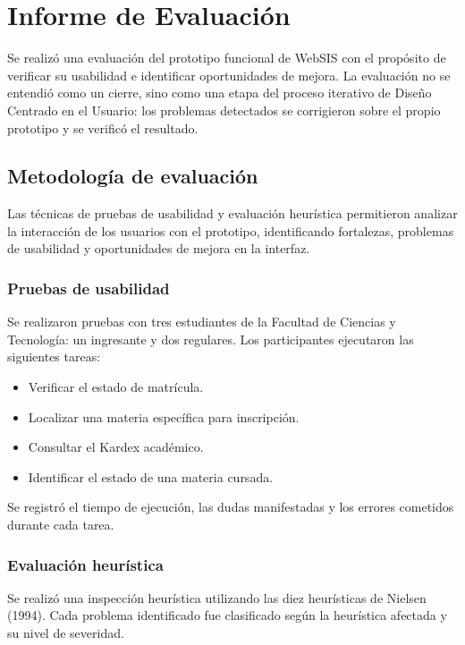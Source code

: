 \section{Informe de Evaluación}

Se realizó una evaluación del prototipo funcional de WebSIS con el propósito de verificar su usabilidad e identificar oportunidades de mejora. La evaluación no se entendió como un cierre, sino como una etapa del proceso iterativo de Diseño Centrado en el Usuario: los problemas detectados se corrigieron sobre el propio prototipo y se verificó el resultado.

\subsection{Metodología de evaluación}

Las técnicas de pruebas de usabilidad y evaluación heurística permitieron analizar la interacción de los usuarios con el prototipo, identificando fortalezas, problemas de usabilidad y oportunidades de mejora en la interfaz.

\subsubsection{Pruebas de usabilidad}

Se realizaron pruebas con tres estudiantes de la Facultad de Ciencias y Tecnología: un ingresante y dos regulares. Los participantes ejecutaron las siguientes tareas:

\begin{itemize}
  \item Verificar el estado de matrícula.
  \item Localizar una materia específica para inscripción.
  \item Consultar el Kardex académico.
  \item Identificar el estado de una materia cursada.
\end{itemize}

Se registró el tiempo de ejecución, las dudas manifestadas y los errores cometidos durante cada tarea.

\subsubsection{Evaluación heurística}

Se realizó una inspección heurística utilizando las diez heurísticas de Nielsen (1994). Cada problema identificado fue clasificado según la heurística afectada y su nivel de severidad.

